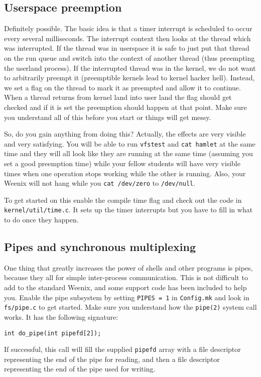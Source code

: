 \subsection{Userspace preemption}
Definitely possible. The basic idea is that a timer interrupt is scheduled to occur every several milliseconds. The interrupt context then looks at the thread which was interrupted. If the thread was in userspace it is safe to just put that thread on the run queue and switch into the context of another thread (thus preempting the userland process). If the interrupted thread was in the kernel, we do not want to arbitrarily preempt it (preemptible kernels lead to kernel hacker hell). Instead, we set a flag on the thread to mark it as preempted and allow it to continue. When a thread returns from kernel land into user land the flag should get checked and if it is set the preemption should happen at that point. Make sure you understand all of this before you start or things will get messy.

So, do you gain anything from doing this? Actually, the effects are very visible and very satisfying. You will be able to run \texttt{vfstest} and \texttt{cat hamlet} at the same time and they will all look like they are running at the same time (assuming you set a good preemption time) while your fellow students will have very visible times when one operation stops working while the other is running. Also, your Weenix will not hang while you \texttt{cat /dev/zero} to \texttt{/dev/null}.

To get started on this enable the compile time flag and check out the code in \texttt{kernel/util/time.c}.  It sets up the timer interrupts but you have to fill in what to do once they happen.

\subsection{Pipes and synchronous multiplexing}
One thing that greatly increases the power of shells and other programs is pipes, because they all for simple inter-process communication. This is not difficult to add to the standard Weenix, and some support code has been included to help you. Enable the pipe subsystem by setting \texttt{PIPES = 1} in \texttt{Config.mk} and look in \texttt{fs/pipe.c} to get started. Make sure you understand how the \texttt{pipe(2)} system call works. It has the following signature:

\begin{verbatim}
int do_pipe(int pipefd[2]);\end{verbatim}
If successful, this call will fill the supplied \texttt{pipefd} array with a file descriptor representing the end of the pipe for reading, and then a file descriptor representing the end of the pipe used for writing.

